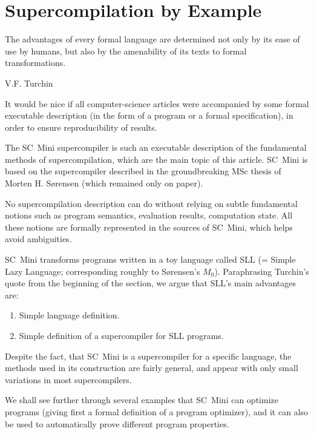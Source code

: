 \section{Supercompilation by Example}
\epigraph{The advantages of every formal language are determined not only
by its ease of use by humans, but also by the amenability of its texts to 
formal transformations.}{V.F. Turchin \cite{Turchin1974EqTrans}}

It would be nice if all computer-science articles were accompanied by some formal 
executable description (in the form of a program or a formal specification),
in order to ensure reproducibility of results.

The SC~Mini supercompiler is such an executable description of the fundamental 
methods of supercompilation, which are the main topic of this article.
SC~Mini is based on the supercompiler described in the groundbreaking
MSc thesis of Morten H. S{\o}rensen
\cite{Sorensen1994TurchinSupercompiler} 
(which remained only on paper).

No supercompilation description can do without relying on subtle fundamental notions
such as program semantics, evaluation results, computation state. 
All these notions are formally represented in the sources of SC~Mini, which helps
avoid ambiguities.

SC~Mini transforms programs written in a toy language called SLL
(= Simple Lazy Language; corresponding roughly to 
S{\o}rensen's $M_0$).
Paraphrasing Turchin's quote from the beginning of the section, we argue
that SLL's main advantages are:
\begin{enumerate}
  \item Simple language definition.
  \item Simple definition of a supercompiler for SLL programs.
\end{enumerate}

Despite the fact, that SC~Mini is a supercompiler for a specific language, the methods used 
in its construction are fairly general, and appear with only small variations in most supercompilers.

We shall see further through several examples that SC~Mini can optimize programs 
(giving first a formal definition of a program optimizer),
and it can also be used to automatically prove different program properties.

%

